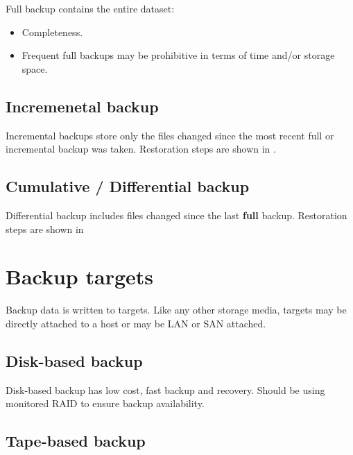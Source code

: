 \documentclass[slides]{pgnotes}
\begin{document}
Full backup contains the entire dataset:

\begin{itemize}
\item
  Completeness.
\item
  Frequent full backups may be prohibitive in terms of time and/or
  storage space.
\end{itemize}

\subsection{Incremenetal backup}
\label{sec:incremental-backup}

Incremental backups store only the files changed since the most recent
full or incremental backup was taken. Restoration steps are shown in .


\subsection{Cumulative / Differential backup}
\label{sec:cumulative-differential-backup}

Differential backup includes files changed since the last \textbf{full}
backup. Restoration steps are shown in


\section{Backup targets}
\label{sec:backup-targets}

Backup data is written to targets. Like any other storage media, targets
may be directly attached to a host or may be LAN or SAN attached.

\subsection{Disk-based backup}
\label{sec:disk-based-backup}

Disk-based backup has low cost, fast backup and recovery. Should be
using monitored RAID to ensure backup availability.

\subsection{Tape-based backup}
\label{sec:tape-based-backup}
\end{document}
